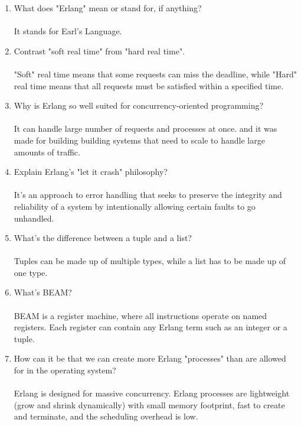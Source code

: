 \documentclass[letterpaper, 10pt]{article}
\begin{document}
\begin{enumerate}
    \item What does "Erlang" mean or stand for, if anything?
    \\\\
    It stands for Earl's Language.

    \item Contrast "soft real time" from "hard real time".
    \\\\
    "Soft" real time means that some requests can miss the deadline, while "Hard" real time means that all requests must be satisfied within a specified time.
    
    \item Why is Erlang so well suited for concurrency-oriented programming?
    \\\\
    It can handle large number of requests and processes at once. and it was made for building building systems that need to scale to handle large amounts of traffic.
    
    \item Explain Erlang's "let it crash" philosophy?
    \\\\
    It's an approach to error handling that seeks to preserve the integrity and reliability of a system by intentionally allowing certain faults to go unhandled.

    \item What's the difference between a tuple and a list?
    \\\\
    Tuples can be made up of multiple types, while a list has to be made up of one type.

    \item What's BEAM?
    \\\\
    BEAM is a register machine, where all instructions operate on named registers. Each register can contain any Erlang term such as an integer or a tuple.

    \item How can it be that we can create more Erlang "processes" than are allowed for in the operating system?
    \\\\
    Erlang is designed for massive concurrency. Erlang processes are lightweight (grow and shrink dynamically) with small memory footprint, fast to create and terminate, and the scheduling overhead is low.
    
\end{enumerate}

\vspace{2em}
\end{document}
